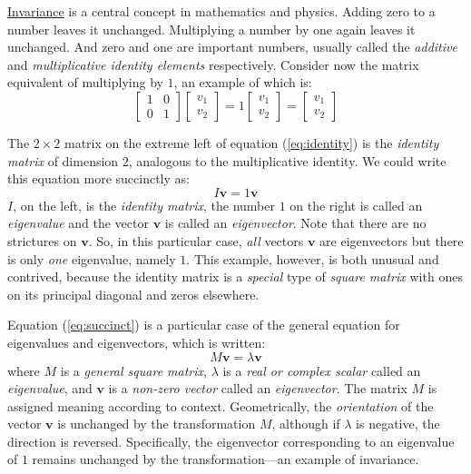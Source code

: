 \documentclass[
  12pt,
  a4paper,
]{article}
\begin{document}
\href{http://mathworld.wolfram.com/Invariant.html}{Invariance} is a
central concept in mathematics and physics. Adding zero to a number
leaves it unchanged. Multiplying a number by one again leaves it
unchanged. And zero and one are important numbers, usually called the
\emph{additive} and \emph{multiplicative identity elements}
respectively. Consider now the matrix equivalent of multiplying by
\(1\), an example of which is: \begin{equation}
\begin{bmatrix}1 & 0\\0 & 1\end{bmatrix}\begin{bmatrix}v_{1}\\v_{2}\end{bmatrix}
= 1\begin{bmatrix}v_{1}\\v_{2}\end{bmatrix} = \begin{bmatrix}v_{1}\\v_{2}\end{bmatrix}
\label{eq:identity}\end{equation}

The \(2 \times 2\) matrix on the extreme left of equation
(\ref{eq:identity}) is the \emph{identity matrix} of dimension \(2\),
analogous to the multiplicative identity. We could write this equation
more succinctly as: \begin{equation}
I\symbf{v} = 1\symbf{v}
\label{eq:succinct}\end{equation} \(I\), on the left, is the
\emph{identity matrix}, the number \(1\) on the right is called an
\emph{eigenvalue} and the vector \(\symbf{v}\) is called an
\emph{eigenvector}. Note that there are no strictures on \(\symbf{v}\).
So, in this particular case, \emph{all} vectors \(\symbf{v}\) are
eigenvectors but there is only \emph{one} eigenvalue, namely \(1\). This
example, however, is both unusual and contrived, because the identity
matrix is a \emph{special} type of \emph{square matrix} with ones on its
principal diagonal and zeros elsewhere.

Equation (\ref{eq:succinct}) is a particular case of the general
equation for eigenvalues and eigenvectors, which is written:
\begin{equation}
M\symbf{v} = \lambda \symbf{v}
\label{eq:eigen}\end{equation} where \(M\) is a \emph{general square
matrix}, \({\lambda}\) is a \emph{real or complex scalar} called an
\emph{eigenvalue}, and \(\symbf{v}\) is a \emph{non-zero vector} called
an \emph{eigenvector}. The matrix \(M\) is assigned meaning according to
context. Geometrically, the \emph{orientation} of the vector
\(\symbf{v}\) is unchanged by the transformation \(M\), although if
\(\lambda\) is negative, the direction is reversed. Specifically, the
eigenvector corresponding to an eigenvalue of \(1\) remains unchanged by
the transformation---an example of invariance.
\end{document}
